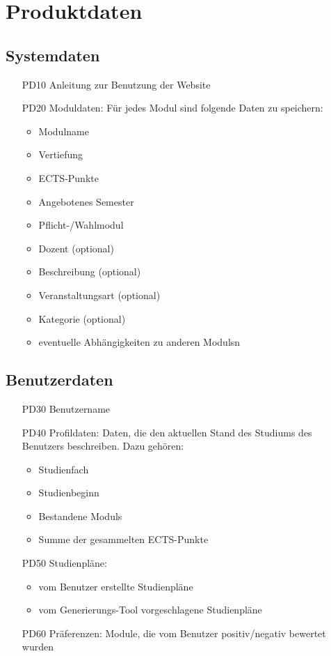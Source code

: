 \section{Produktdaten}

\subsection{Systemdaten}
	
\begin{itemize}[nosep]
	\item[PD10]Anleitung zur Benutzung der Website
	\item[PD20] \gls{Modul}daten: Für jedes \gls{Modul} sind folgende Daten zu speichern:
	\begin{itemize}
		\item \gls{Modul}name
		\item Vertiefung
		\item \gls{ECTS-Punkte}
		\item Angebotenes Semester	
		\item Pflicht-/Wahlmodul 	
		\item Dozent (optional)
		\item Beschreibung (optional)
		\item Veranstaltungsart (optional)
		\item Kategorie (optional)
		\item eventuelle Abhängigkeiten zu anderen \glspl{Modul}n
	\end{itemize}
	 
\end{itemize}

\subsection{Benutzerdaten}
\label{subsec:product_data-benutzerdaten}  %

\begin{itemize}[nosep]
	\item[PD30]Benutzername
	\item[PD40]Profildaten: Daten, die den aktuellen Stand des Studiums des Benutzers beschreiben. Dazu gehören: 
	\begin{itemize}
		\item Studienfach
		\item Studienbeginn	
		\item Bestandene \glspl{Modul} 
		\item Summe der gesammelten \gls{ECTS-Punkte}
	\end{itemize}
	\item[PD50] Studienpläne:
	\begin{itemize}
		\item 	vom Benutzer erstellte Studienpläne 
		\item	vom \gls{Generierungs-Tool} vorgeschlagene Studienpläne 
	\end{itemize} 
	\item[PD60] Präferenzen: Module, die vom Benutzer positiv/negativ bewertet wurden
\end{itemize}